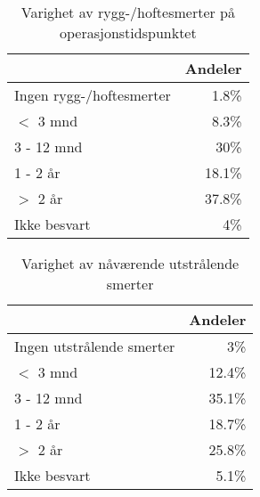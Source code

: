 \documentclass [norsk,a4paper,twoside]{article}\usepackage[]{graphicx}\usepackage[]{color}
\begin{document}
\begin{table}[ht]
\centering
\begin{tabular}{lr}
  \hline
 & Andeler \\ 
  \hline
Ingen rygg-/hoftesmerter & 1.8\% \\ 
  $<$ 3 mnd & 8.3\% \\ 
  3 - 12 mnd & 30\% \\ 
  1 - 2 år & 18.1\% \\ 
  $>$ 2 år & 37.8\% \\ 
  Ikke besvart & 4\% \\ 
   \hline
\end{tabular}
\caption{Varighet av rygg-/hoftesmerter på operasjonstidspunktet} 
\label{tab:SmRH}
\end{table}
\begin{table}[ht]
\centering
\begin{tabular}{lr}
  \hline
 & Andeler \\ 
  \hline
Ingen utstrålende smerter & 3\% \\ 
  $<$ 3 mnd & 12.4\% \\ 
  3 - 12 mnd & 35.1\% \\ 
  1 - 2 år & 18.7\% \\ 
  $>$ 2 år & 25.8\% \\ 
  Ikke besvart & 5.1\% \\ 
   \hline
\end{tabular}
\caption{Varighet av nåværende utstrålende smerter} 
\label{tab:Utstr}
\end{table}
\end{document}
